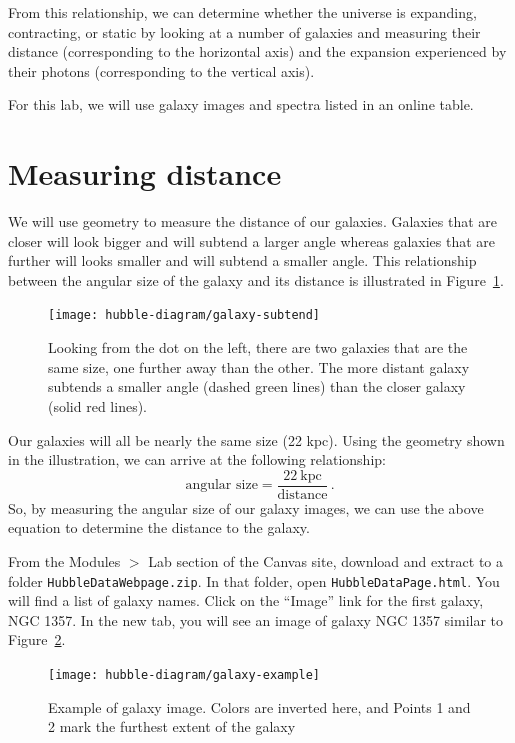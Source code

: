 From this relationship, we can determine whether the universe is
expanding, contracting, or static by looking at a number of galaxies and
measuring their distance (corresponding to the horizontal axis) and the
expansion experienced by their photons (corresponding to the vertical axis).

For this lab, we will use galaxy images and spectra listed in an online
table.

\section{Measuring distance}

We will use geometry to measure the distance of our galaxies. Galaxies
that are closer will look bigger and will subtend a larger angle whereas
galaxies that are further will looks smaller and will subtend a smaller
angle. This relationship between the angular size of the galaxy and its
distance is illustrated in Figure~\ref{hd:fig:galaxy-subtend}.

\begin{figure}
	\centering
	\texttt{[image: hubble-diagram/galaxy-subtend]}
	\caption{Looking from the dot on the left, there are two galaxies that are the same size, one further away than the other. The more distant galaxy subtends a smaller angle (dashed green lines) than the closer galaxy (solid red lines).}\label{hd:fig:galaxy-subtend}
\end{figure}

Our galaxies will all be nearly the same size (22 kpc). Using the
geometry shown in the illustration, we can arrive at the following
relationship:
\begin{equation}\label{hd:eq:size}
 \textrm{angular size} = \frac{22\:\textrm{kpc}}{\textrm{distance}} \,.
\end{equation}
So, by measuring the angular size of our galaxy images, we can use the
above equation to determine the distance to the galaxy.

From the Modules $>$ Lab section of the Canvas site, download and extract to a folder \texttt{HubbleDataWebpage.zip}. In that folder, open \texttt{HubbleDataPage.html}. You
will find a list of galaxy names. Click on the ``Image'' link for the first
galaxy, NGC 1357. In the new tab, you will see an image of galaxy NGC
1357 similar to Figure~\ref{hd:fig:galaxy-example}.

\begin{figure}
	\centering
	\texttt{[image: hubble-diagram/galaxy-example]}
	\caption{Example of galaxy image. Colors are inverted here, and Points 1 and 2 mark the furthest extent of the galaxy}\label{hd:fig:galaxy-example}
\end{figure}

